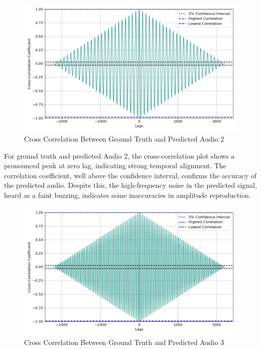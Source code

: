 \documentclass{ioereport}
\begin{document}
    \begin{figure}[H]
        \centering
        \includegraphics[width=\linewidth]{assets/crosscorrelation/cross_correlation_puretone500hz.wav_puretone500hzpred.wav.png}
        \caption{Cross Correlation Between Ground Truth and Predicted Audio 2}
        \label{fig:cross-correlation-2}
    \end{figure}

    For ground truth and predicted Audio 2, the cross-correlation plot shows a pronounced peak at zero lag, indicating strong temporal alignment. The correlation coefficient, well above the confidence interval, confirms the accuracy of the predicted audio. Despite this, the high-frequency noise in the predicted signal, heard as a faint buzzing, indicates some inaccuracies in amplitude reproduction.

    \begin{figure}[H]
        \centering
        \includegraphics[width=\linewidth]{assets/crosscorrelation/cross_correlation_puretone1000hz.wav_puretone1000hzpred.wav.png}
        \caption{Cross Correlation Between Ground Truth and Predicted Audio 3}
        \label{fig:cross-correlation-3}
    \end{figure}
\end{document}
